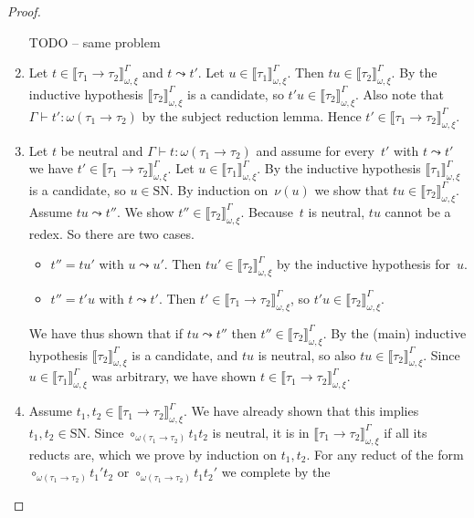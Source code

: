 \documentclass[runningheads,a4paper]{llncs}
\newcommand{\SN}{\mathrm{SN}}
\newcommand{\val}[3]{\ensuremath{\llbracket#1\rrbracket_{#2}^{#3}}}
\newcommand{\proves}{\vdash}
\begin{document}
\begin{proof}
\begin{enumerate}
    TODO -- same problem
  \item Let $t \in \val{\tau_1\to\tau_2}{\omega,\xi}{\Gamma}$ and
    $t \leadsto t'$. Let $u \in
    \val{\tau_1}{\omega,\xi}{\Gamma}$. Then
    $t u \in \val{\tau_2}{\omega,\xi}{\Gamma}$. By the inductive
    hypothesis $\val{\tau_2}{\omega,\xi}{\Gamma}$ is a candidate, so
    $t' u \in \val{\tau_2}{\omega,\xi}{\Gamma}$. Also note that
    $\Gamma \proves t' : \omega(\tau_1 \to \tau_2)$ by the subject
    reduction lemma. Hence
    $t' \in \val{\tau_1\to\tau_2}{\omega,\xi}{\Gamma}$.
  \item Let $t$ be neutral and
    $\Gamma \proves t : \omega(\tau_1 \to \tau_2)$ and assume for
    every~$t'$ with $t \leadsto t'$ we have
    $t' \in \val{\tau_1\to\tau_2}{\omega,\xi}{\Gamma}$. Let
    $u \in \val{\tau_1}{\omega,\xi}{\Gamma}$. By the inductive
    hypothesis $\val{\tau_1}{\omega,\xi}{\Gamma}$ is a candidate, so
    $u \in \SN$. By induction on~$\nu(u)$ we show that
    $t u \in \val{\tau_2}{\omega,\xi}{\Gamma}$. Assume
    $t u \leadsto t''$. We show
    $t'' \in \val{\tau_2}{\omega,\xi}{\Gamma}$. Because~$t$ is
    neutral, $t u$ cannot be a redex. So there are two cases.
    \begin{itemize}
    \item $t'' = t u'$ with $u \leadsto u'$. Then
      $t u' \in \val{\tau_2}{\omega,\xi}{\Gamma}$ by the inductive
      hypothesis for~$u$.
    \item $t'' = t' u$ with $t \leadsto t'$. Then
      $t' \in \val{\tau_1\to\tau_2}{\omega,\xi}{\Gamma}$, so
      $t' u \in \val{\tau_2}{\omega,\xi}{\Gamma}$.
    \end{itemize}
    We have thus shown that if $t u \leadsto t''$ then
    $t'' \in \val{\tau_2}{\omega,\xi}{\Gamma}$. By the (main)
    inductive hypothesis $\val{\tau_2}{\omega,\xi}{\Gamma}$ is a
    candidate, and $t u$ is neutral, so also
    $t u \in \val{\tau_2}{\omega,\xi}{\Gamma}$. Since
    $u \in \val{\tau_1}{\omega,\xi}{\Gamma}$ was arbitrary, we have
    shown $t \in \val{\tau_1\to\tau_2}{\omega,\xi}{\Gamma}$.
  \item Assume $t_1,t_2 \in \val{\tau_1\to\tau_2}{\omega,\xi}{\Gamma}$.
    We have already shown that this implies $t_1,t_2 \in \SN$.
    Since $\circ_{\omega(\tau_1\to\tau_2)} t_1 t_2$ is neutral, it is
    in $\val{\tau_1\to\tau_2}{\omega,\xi}{\Gamma}$ if all its reducts
    are, which we prove by induction on $t_1,t_2$.  For any reduct of
    the form $\circ_{\omega(\tau_1\to\tau_2)} t_1' t_2$ or
    $\circ_{\omega(\tau_1\to\tau_2)} t_1 t_2'$ we complete by the

\end{enumerate}
\end{proof}
\end{document}
